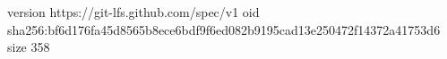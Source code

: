 version https://git-lfs.github.com/spec/v1
oid sha256:bf6d176fa45d8565b8ece6bdf9f6ed082b9195cad13e250472f14372a41753d6
size 358
